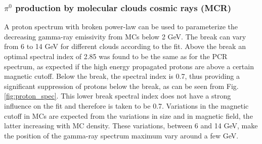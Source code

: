 
\subsubsection{$\pi^0$ production by molecular clouds cosmic rays (MCR)}

A proton spectrum with broken power-law can be used to parameterize the decreasing gamma-ray emissivity from MCs below 2 GeV. The break can vary from 6 to 14 GeV for different clouds according to the fit. Above the break an optimal spectral index of 2.85 was found to be the same as for the PCR spectrum, as expected if the high energy propagated protons are above a certain magnetic cutoff. Below the break, the spectral index is 0.7, thus providing a significant suppression of protons below the break, as can be seen from Fig. \ref{fig:proton_spec}. This lower break spectral index does not have a strong influence on the fit and therefore is taken to be 0.7.
Variations in the magnetic cutoff in MCs are expected from the variations in size and in magnetic field, the latter increasing with MC density. \cite{Crutcher2012} 
These variations, between 6 and 14 GeV, make the position of the gamma-ray spectrum maximum vary around a few GeV.

